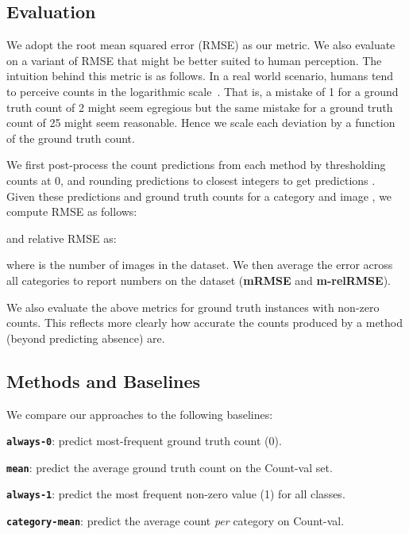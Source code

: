 \documentclass[10pt,twocolumn,letterpaper]{article}
\begin{document}
\subsection{Evaluation}\label{subsec:metrics}
We adopt the root mean squared error (RMSE) as our metric.
We also evaluate on a variant of RMSE that might be better suited to human perception. The intuition behind this metric is as follows. In a real world scenario, humans tend to perceive counts in the logarithmic scale~\cite{dehaene2008log}.
That is, a mistake of 1 for a ground truth count of 2 might seem egregious but the same mistake for a ground truth count of 25 might seem reasonable. Hence we scale each deviation by a function of the ground truth count.

We first post-process the count predictions from each method by thresholding counts at 0, and rounding predictions to closest integers to get predictions . Given these predictions and ground truth counts  for a category  and image , we compute RMSE as follows:
\vspace{-5pt}


and relative RMSE as:
\vspace{-5pt}



where  is the number of images in the dataset. We then average the error across all categories to report numbers on the dataset (\textbf{mRMSE} and \textbf{m-relRMSE}). 


We also evaluate the above metrics for ground truth instances with non-zero counts. This reflects more clearly how accurate the counts produced by a method (beyond predicting absence) are. 



\subsection{Methods and Baselines}
We compare our approaches to the following baselines:

\noindent \textbf{\texttt{always-0}}: predict most-frequent ground truth count (0).

\noindent \textbf{\texttt{mean}}: predict the average ground truth count on the Count-val set.

\noindent \textbf{\texttt{always-1}}: predict the most frequent non-zero value (1) for all classes.

\noindent \textbf{\texttt{category-mean}}: predict the average count \emph{per} category on Count-val.
\end{document}
